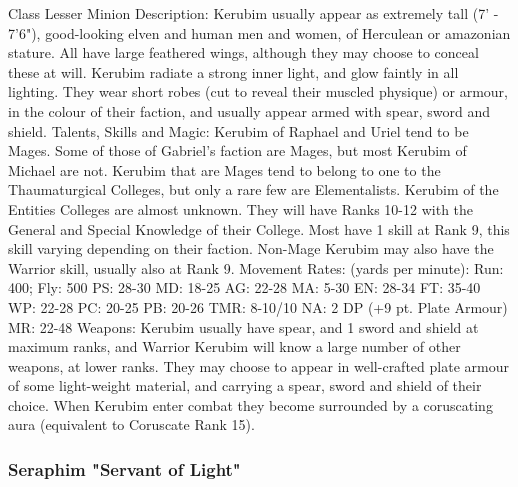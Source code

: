 \begin{Description}

\item[Class] Lesser Minion
Description: Kerubim usually appear as extremely tall (7' - 7'6"), good-looking elven and human men and women, of Herculean or amazonian stature. All have large feathered wings, although they may choose to conceal these at will. Kerubim radiate a strong inner light, and glow faintly in all lighting. They wear short robes (cut to reveal their muscled physique) or armour, in the colour of their faction, and usually appear armed with spear,  sword and shield.
Talents, Skills and Magic: Kerubim of Raphael and Uriel tend to be Mages. Some of those of Gabriel's faction are Mages, but most Kerubim of Michael are not. Kerubim that are Mages tend to belong to one to the Thaumaturgical Colleges, but only a rare few are Elementalists. Kerubim of the Entities Colleges are almost unknown. They will have Ranks 10-12 with the General and Special Knowledge of their College. Most have 1 skill at Rank 9, this skill varying depending on their faction. Non-Mage Kerubim may also have the Warrior skill, usually also at Rank 9.
Movement Rates: (yards per minute): Run: 400; Fly: 500
PS: 28-30		MD: 18-25	AG: 22-28	MA: 5-30
EN: 28-34	FT: 35-40	WP: 22-28	PC: 20-25
PB: 20-26	TMR: 8-10/10	NA: 2 DP (+9 pt. Plate Armour)
MR: 22-48
Weapons: Kerubim usually have spear, and 1 sword and shield at maximum ranks, and Warrior Kerubim will know a large number of other weapons, at lower ranks. They may choose to appear in well-crafted plate armour of some light-weight material, and carrying a spear, sword and shield of their choice. When Kerubim enter combat they become surrounded by a coruscating aura (equivalent to Coruscate Rank 15).
\end{Description}

\subsubsection{Seraphim "Servant of Light"}

